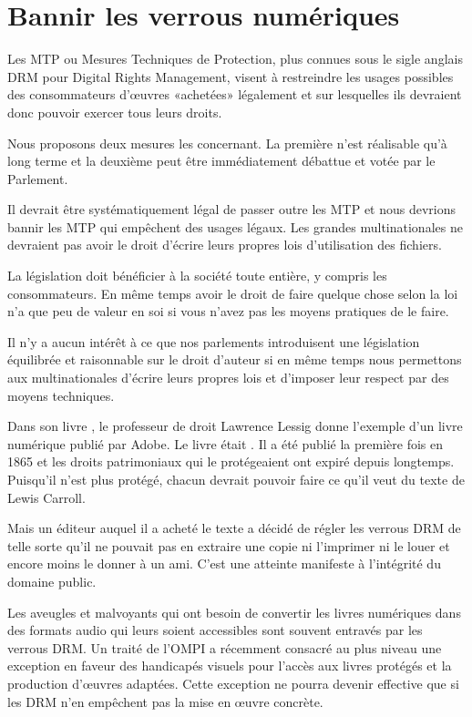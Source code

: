 \chapter{Bannir les verrous numériques}\label{verrous}

Les MTP ou Mesures Techniques de
Protection, plus
connues sous le sigle anglais DRM pour Digital
Rights Management, visent à restreindre les usages possibles des consommateurs d’œuvres «achetées»
légalement et sur lesquelles ils devraient donc pouvoir exercer tous leurs droits. 

Nous proposons deux mesures les concernant. La première n'est réalisable qu'à long terme et la deuxième peut être immédiatement débattue et votée par le Parlement.

\begin{mesure}
 Il devrait être systématiquement légal de passer outre les MTP et nous devrions bannir les MTP qui
empêchent des usages légaux. Les grandes multinationales ne devraient pas avoir le droit d’écrire
leurs propres lois d’utilisation des fichiers.
\end{mesure}

La législation doit bénéficier à la société toute entière, y compris les consommateurs. En même temps avoir le droit
de faire quelque chose selon la loi n’a que peu de valeur en soi si vous n’avez pas les moyens
pratiques de le faire.

Il n’y a aucun intérêt à ce que nos parlements introduisent une législation équilibrée et
raisonnable sur le droit d’auteur si en même temps nous permettons aux multinationales d’écrire
leurs propres lois et d’imposer leur respect par des moyens techniques.

Dans son livre , le professeur de droit Lawrence Lessig donne l’exemple d’un livre
numérique publié par Adobe. Le livre était . Il a été publié la première
fois en 1865 et les droits patrimoniaux qui le protégeaient ont expiré depuis longtemps. Puisqu’il n’est plus protégé,
chacun devrait pouvoir faire ce qu’il veut du texte de Lewis Carroll.

Mais un éditeur auquel il a acheté le texte a décidé de régler les verrous DRM de telle sorte qu'il ne pouvait pas en extraire une copie ni l’imprimer ni le louer et encore moins le donner à un ami. C'est une atteinte manifeste à l'intégrité du domaine public.  

Les aveugles et malvoyants qui ont besoin de convertir les livres numériques dans des formats audio
qui leurs soient accessibles sont souvent entravés par les verrous DRM. Un traité de l'OMPI a récemment consacré au plus niveau une exception en faveur des handicapés visuels pour l'accès aux livres protégés et la production d'œuvres adaptées. Cette exception ne pourra devenir effective que si les DRM n'en empêchent pas la mise en œuvre concrète.

